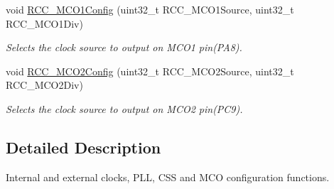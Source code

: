 \begin{DoxyCompactItemize}
void \hyperlink{group___r_c_c___group1_ga15c9ecb6ef015ed008cb28e5b7a50531}{R\+C\+C\+\_\+\+M\+C\+O1\+Config} (uint32\+\_\+t R\+C\+C\+\_\+\+M\+C\+O1\+Source, uint32\+\_\+t R\+C\+C\+\_\+\+M\+C\+O1\+Div)
\begin{DoxyCompactList}\small\item\em Selects the clock source to output on M\+C\+O1 pin(\+P\+A8). \end{DoxyCompactList}\item 
void \hyperlink{group___r_c_c___group1_gaf50f10675b747de60c739e44e5c22aee}{R\+C\+C\+\_\+\+M\+C\+O2\+Config} (uint32\+\_\+t R\+C\+C\+\_\+\+M\+C\+O2\+Source, uint32\+\_\+t R\+C\+C\+\_\+\+M\+C\+O2\+Div)
\begin{DoxyCompactList}\small\item\em Selects the clock source to output on M\+C\+O2 pin(\+P\+C9). \end{DoxyCompactList}\end{DoxyCompactItemize}


\subsection{Detailed Description}
Internal and external clocks, P\+LL, C\+SS and M\+CO configuration functions. 

